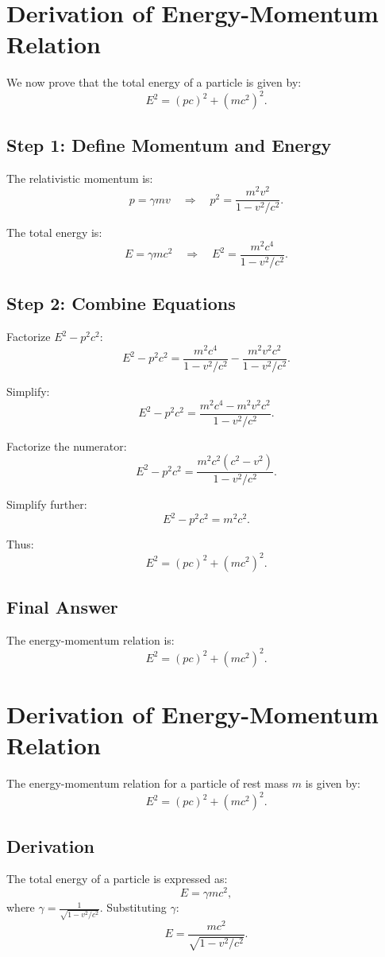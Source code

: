 \documentclass[a4paper,12pt]{article}
\begin{document}
\begin{multicols}{2}
\section{Derivation of Energy-Momentum Relation}
We now prove that the total energy of a particle is given by:
\[
E^2 = (pc)^2 + (mc^2)^2.
\]

\subsection*{Step 1: Define Momentum and Energy}
The relativistic momentum is:
\[
p = \gamma mv \quad \Rightarrow \quad p^2 = \frac{m^2v^2}{1 - v^2/c^2}.
\]

The total energy is:
\[
E = \gamma mc^2 \quad \Rightarrow \quad E^2 = \frac{m^2c^4}{1 - v^2/c^2}.
\]

\subsection*{Step 2: Combine Equations}
Factorize \( E^2 - p^2c^2 \):
\[
E^2 - p^2c^2 = \frac{m^2c^4}{1 - v^2/c^2} - \frac{m^2v^2c^2}{1 - v^2/c^2}.
\]

Simplify:
\[
E^2 - p^2c^2 = \frac{m^2c^4 - m^2v^2c^2}{1 - v^2/c^2}.
\]

Factorize the numerator:
\[
E^2 - p^2c^2 = \frac{m^2c^2(c^2 - v^2)}{1 - v^2/c^2}.
\]

Simplify further:
\[
E^2 - p^2c^2 = m^2c^2.
\]

Thus:
\[
E^2 = (pc)^2 + (mc^2)^2.
\]

\subsection*{Final Answer}
The energy-momentum relation is:
\[
E^2 = (pc)^2 + (mc^2)^2.
\]

\section{Derivation of Energy-Momentum Relation}
The energy-momentum relation for a particle of rest mass $m$ is given by:
\[
E^2 = (pc)^2 + (mc^2)^2.
\]

\subsection*{Derivation}
The total energy of a particle is expressed as:
\[
E = \gamma mc^2,
\]
where $\gamma = \frac{1}{\sqrt{1 - v^2/c^2}}$. Substituting $\gamma$:
\[
E = \frac{mc^2}{\sqrt{1 - v^2/c^2}}. \tag{L1}
\]


\end{multicols}
\end{document}
